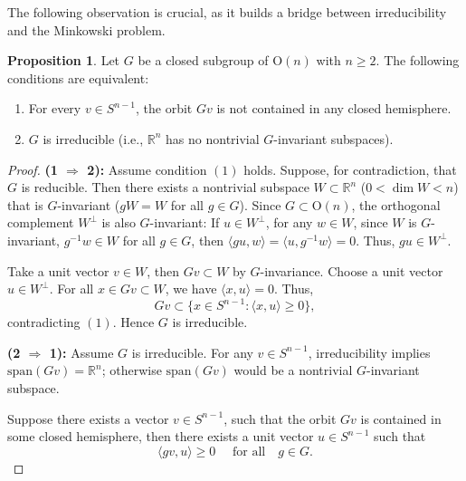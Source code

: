 \documentclass[12pt, reqno]{amsart}
\theoremstyle{definition}
\newtheorem{proposition}[theorem]{Proposition}
\theoremstyle{remark}
\numberwithin{equation}{section}
\newcommand{\Sn}{S^{n-1}}
\newcommand{\On}{\mathrm{O}(n)}
\begin{document}
	
	The following observation is crucial, as it builds a bridge between irreducibility and the Minkowski problem.
	
	\begin{proposition}\label{irr just}
		Let $G$ be a  closed subgroup of $\On$ with $n\ge2$. The following conditions are equivalent:
		\begin{enumerate}
			\item For every  $v \in S^{n-1}$, the orbit $Gv$ is not contained in any closed hemisphere.
		
			\item  $G$  is irreducible (i.e., $\mathbb{R}^n$ has no nontrivial $G$-invariant subspaces).
		\end{enumerate}
	\end{proposition}
	
	\begin{proof}
		\noindent\textbf{(1 $\Rightarrow$ 2):}
		Assume condition $(1)$ holds. Suppose, for contradiction, that $G$ is reducible. Then there exists a nontrivial  subspace $W \subset \mathbb{R}^n$ ($0 < \dim W < n$) that is $G$-invariant ($gW=W$ for all $g\in G$). Since $G \subset \On$, the orthogonal complement $W^\perp$ is also $G$-invariant: If $u\in W^{\perp}$, for any $w\in W$,  since $W$ is $G$-invariant, $g^{-1}w\in W$ for all $g\in G$, then $\langle gu, w \rangle=\langle u, g^{-1}w\rangle=0$. Thus, $gu\in W^{\perp}$. 
		
		
		
		Take a unit vector $v \in W$, then $Gv \subset W$ by $G$-invariance. Choose a unit vector $u \in W^\perp$. For all $x \in Gv \subset W$, we have $\langle x, u \rangle = 0$. Thus,
		\[
		Gv \subset \{x \in S^{n-1} : \langle x, u \rangle \geq 0\},
		\]
		contradicting $(1)$. Hence $G$ is irreducible.
		
		\noindent\textbf{(2 $\Rightarrow$ 1):}
		Assume $G$ is irreducible. For any $v\in\Sn$,   irreducibility implies $\text{span}(Gv) = \mathbb{R}^n$; otherwise $\text{span}(Gv)$ would be a nontrivial $G$-invariant subspace. 
		
	
		
			Suppose there exists a vector $v \in S^{n-1}$, such that the orbit $Gv$ is  contained in some closed hemisphere, then there exists a  unit vector $u \in S^{n-1}$ such that
			\begin{equation}\label{closed hemi}
		 \langle g v, u \rangle \geq 0 \quad\text{ for all}\quad g \in G.
		 \end{equation}
		 

\end{proof}
\end{document}
